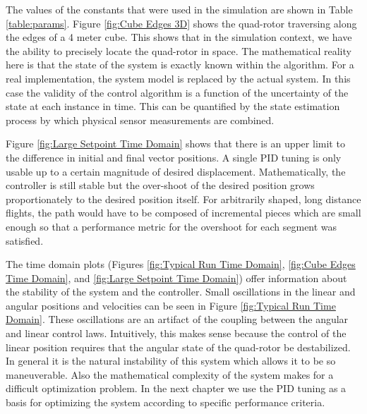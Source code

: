 The values of the constants that were used in the simulation are shown in Table \ref{table:params}. Figure \ref{fig:Cube Edges 3D} shows the quad-rotor traversing along the edges of a 4 meter cube. This shows that in the simulation context, we have the ability to precisely locate the quad-rotor in space. The mathematical reality here is that the state of the system is exactly known within the algorithm. For a real implementation, the system model is replaced by the actual system. In this case the validity of the control algorithm is a function of the uncertainty of the state at each instance in time. This can be quantified by the state estimation process by which physical sensor measurements are combined.

Figure \ref{fig:Large Setpoint Time Domain} shows that there is an upper limit to the difference in initial and final vector positions. A single PID tuning is only usable up to a certain magnitude of desired displacement. Mathematically, the controller is still stable but the over-shoot of the desired position grows proportionately to the desired position itself. For arbitrarily shaped, long distance flights, the path would have to be composed of incremental pieces which are small enough so that a performance metric for the overshoot for each segment was satisfied.

The time domain plots (Figures     \ref{fig:Typical Run Time Domain},   \ref{fig:Cube Edges Time Domain}, and \ref{fig:Large Setpoint Time Domain}) offer information about the stability of the system and the controller. Small oscillations in the linear and angular positions and velocities can be seen in Figure \ref{fig:Typical Run Time Domain}. These oscillations are an artifact of the coupling between the angular and linear control laws. Intuitively, this makes sense because the control of the linear position requires that the angular state of the quad-rotor be destabilized. In general it is the natural instability of this system which allows it to be so maneuverable. Also the mathematical complexity of the system makes for a difficult optimization problem. In the next chapter we use the PID tuning as a basis for optimizing the system according to specific performance criteria.


